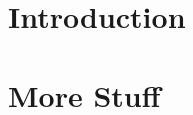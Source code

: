 \documentclass{article}
\author{O. Akcatepe}
\date{\today}
\begin{document}
\maketitle

\section{Introduction}


\section{More Stuff}
\end{document}

